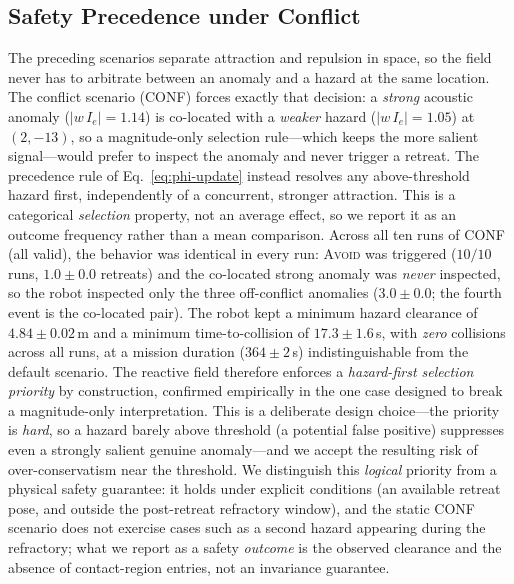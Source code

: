\subsection{Safety Precedence under Conflict}
\label{sec:conflict}
The preceding scenarios separate attraction and repulsion in space, so the field
never has to arbitrate between an anomaly and a hazard at the same location. The
conflict scenario (CONF) forces exactly that decision: a \emph{strong} acoustic
anomaly ($|w\,I_e|=1.14$) is co-located with a \emph{weaker} hazard
($|w\,I_e|=1.05$) at $(2,-13)$, so a magnitude-only selection rule---which keeps
the more salient signal---would prefer to inspect the anomaly and never trigger
a retreat. The precedence rule of Eq.~\eqref{eq:phi-update} instead resolves any
above-threshold hazard first, independently of a concurrent, stronger attraction.
This is a categorical \emph{selection} property, not an average effect, so we
report it as an outcome frequency rather than a mean comparison. Across all ten runs of CONF
(all valid), the behavior was identical in every run: \textsc{Avoid} was
triggered ($10/10$ runs, $1.0\pm0.0$ retreats) and the co-located strong anomaly
was \emph{never} inspected, so the robot inspected only the three off-conflict
anomalies ($3.0\pm0.0$; the fourth event is the co-located pair). The robot kept a
minimum hazard clearance of $4.84\pm0.02$\,m and a minimum time-to-collision of
$17.3\pm1.6$\,s, with \emph{zero} collisions across all runs, at a mission duration
($364\pm2$\,s) indistinguishable from the default scenario. The reactive
field therefore enforces a \emph{hazard-first selection priority} by construction,
confirmed empirically in the one case designed to break a magnitude-only
interpretation. This is a deliberate design choice---the priority is \emph{hard},
so a hazard barely above threshold (a potential false positive) suppresses even a
strongly salient genuine anomaly---and we accept the resulting risk of
over-conservatism near the threshold. We distinguish this \emph{logical} priority
from a physical safety guarantee: it holds under explicit conditions (an available
retreat pose, and outside the post-retreat refractory window), and the static CONF
scenario does not exercise cases such as a second hazard appearing during the
refractory; what we report as a safety \emph{outcome} is the observed clearance and
the absence of contact-region entries, not an invariance guarantee.

